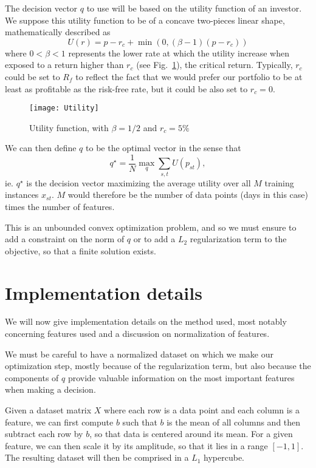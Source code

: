 \documentclass[11pt,fleqn]{article}
\newcommand{\figref}[1]{Fig.~\ref{#1}}
\begin{document}
The decision vector $q$ to use will be based on the utility function of an investor. We
suppose this utility function to be of a concave two-pieces linear shape, mathematically
described as 
\begin{equation*}
  U(r) = p-r_c + \min(0,(\beta-1)(p-r_c))
\end{equation*}
where $0<\beta<1$ represents the lower rate at which the utility increase when exposed to
a return higher than $r_c$ (see \figref{fig:utility}), the critical return. Typically,
$r_c$ could be set to $R_f$ to reflect the fact that we would prefer our portfolio to be
at least as profitable as the risk-free rate, but it could be also set to $r_c=0$.

\begin{figure}
  \centering
  \texttt{[image: Utility]}
  \caption{Utility function, with $\beta=1/2$ and $r_c=5\%$}
  \label{fig:utility}
\end{figure}

We can then define $q$ to be the optimal vector in the sense that
\begin{equation*}
  q^\star = \frac{1}{N} \max_q \sum_{s,t} U(p_{st}),
\end{equation*}
ie. $q^\star$ is the decision vector maximizing the average utility over all $M$ training
instances $x_{st}$. $M$ would therefore be the number of data points (days in this case)
times the number of features.

This is an unbounded convex optimization problem, and so we must ensure to add a
constraint on the norm of $q$ or to add a $L_2$ regularization term to the objective, so
that a finite solution exists.

\section{Implementation details}

We will now give implementation details on the method used, most notably concerning
features used and a discussion on normalization of features.

We must be careful to have a normalized dataset on which we make our optimization step,
mostly because of the regularization term, but also because the components of $q$ provide
valuable information on the most important features when making a decision. 

Given a dataset matrix $X$ where each row is a data point and each column is a feature, we
can first compute $b$ such that $b$ is the mean of all columns and then subtract each row
by $b$, so that data is centered around its mean. For a given feature, we can then scale
it by its amplitude, so that it lies in a range $[-1,1]$. The resulting dataset will then
be comprised in a $L_1$ hypercube. 
\end{document}
